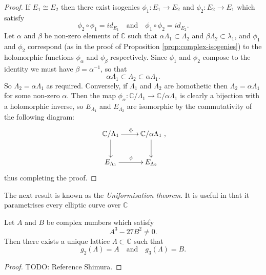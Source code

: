  \begin{proof}
   If $E_{1} \cong E_{2}$ then there exist isogenies $\phi_{1} : E_{1} \rightarrow
   E_{2}$ and $\phi_{2} : E_{2} \rightarrow E_{1}$ which satisfy
   \begin{equation*}
     \phi_{2} \circ \phi_{1} = id_{E_{1}} \quad \text{and} \quad \phi_{1} \circ
     \phi_{2} = id_{E_{2}}.
   \end{equation*}
   Let $\alpha$ and $\beta$ be non-zero elements of $\mathbb{C}$ such that $\alpha
   \Lambda_{1} \subset \Lambda_{2}$ and $\beta \Lambda_{2} \subset \lambda_{1}$, and
   $\phi_{1}$ and $\phi_{2}$ correspond (as in the proof of Proposition
   \ref{prop:complex-isogenies}) to the holomorphic functions $\phi_{\alpha}$ and
   $\phi_{\beta}$ respectively.  Since $\phi_{1}$ and $\phi_{2}$ compose to the
   identity we must have $\beta = \alpha^{-1}$, so that
   \begin{equation*}
     \alpha \Lambda_{1} \subset \Lambda_{2} \subset \alpha \Lambda_{1}.
   \end{equation*}
   So $\Lambda_{2} = \alpha \Lambda_{1}$ as required.  Conversely, if $\Lambda_{1}$
   and $\Lambda_{2}$ are homothetic then $\Lambda_{2} = \alpha \Lambda_{1}$ for some
   non-zero $\alpha$.  Then the map $\phi_{\alpha} : \mathbb{C} / \Lambda_{1}
   \rightarrow \mathbb{C} / \alpha \Lambda_{1}$ is clearly a bijection with a
   holomorphic inverse, so $E_{\Lambda_{1}}$ and $E_{\Lambda_{2}}$ are isomorphic by
   the commutativity of the following diagram:
   \begin{equation*}
     \xymatrix{
       \mathbb{C} / \Lambda_{1} \ar[d] \ar[r]^{\Phi} & \mathbb{C} / \alpha \Lambda_{1} \ar[d]\\
       E_{\Lambda_{1}} \ar[r]^{\phi }& E_{\Lambda_{2}}
     },
   \end{equation*}
   thus completing the proof.
 \end{proof}

 The next result is known as the \emph{Uniformisation theorem}.  It is useful in that
 it parametrises every elliptic curve over $\mathbb{C}$

 \begin{thm}
   \label{thm:uniformisation-theorem}
   Let $A$ and $B$ be complex numbers which satisfy
   \begin{equation*}
     A^{3} - 27B^{2} \neq 0.
   \end{equation*}
   Then there exists a unique lattice $\Lambda \subset \mathbb{C}$ such that
   \begin{equation*}
     g_{2}(\Lambda) = A \quad \text{and} \quad g_{3}(\Lambda) = B.
   \end{equation*}
 \end{thm}
 \begin{proof}
   TODO: Reference Shimura.
 \end{proof}

